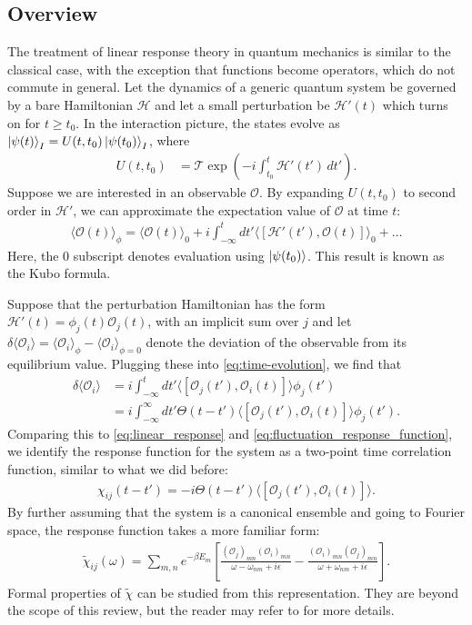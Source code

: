 \documentclass[prl,
twocolumn,
nofootinbib,
amsmath,amssymb,
aps]{revtex4-1}
\newcommand{\be}{\beta}
\newcommand{\f}[2]{\frac{#1}{#2}}
\newcommand{\lp}{\left(}
\newcommand{\rp}{\right)}
\newcommand{\lb}{\left[}
\newcommand{\rb}{\right]}
\begin{document}
\subsection{Overview}
The treatment of linear response theory in quantum mechanics is similar to the classical case, with the exception that functions become operators, which do not commute in general. Let the dynamics of a generic quantum system be governed by a bare Hamiltonian $\mathcal{H}$ and let a small perturbation be $\mathcal{H}'(t)$ which turns on for $t\geq t_0$. In the interaction picture, the states evolve as $\ket{\psi(t)}_I = U(t,t_0) \ket{\psi(t_0)}_I$, where
\begin{align*}
U(t,t_0) 
&= \mathcal{T} \exp\lp -i \int_{t_0}^t  \mathcal{H}'(t')\,dt'\rp.
\end{align*}
Suppose we are interested in an observable $\mathcal{O}$. By expanding $U(t,t_0)$ to second order in $\mathcal{H}'$, we can approximate the expectation value of $\mathcal{O}$ at time $t$:
\begin{align}
\label{eq:time-evolution}
\langle \mathcal{O}(t) \rangle_{\phi} = \langle \mathcal{O}(t) \rangle_{0} + i \int_{-\infty}^t dt' \langle [\mathcal{H'}(t'), \mathcal{O} (t)] \rangle_{0} + \dots
\end{align}
Here, the $0$ subscript denotes evaluation using $\ket{\psi(t_0)}$.  This result is known as the Kubo formula. 

Suppose that the perturbation Hamiltonian has the form $\mathcal{H}'(t) =  \phi_j (t) \mathcal{O}_j(t)$, with an implicit sum over $j$ and let $\delta \langle \mathcal{O}_i \rangle = \langle \mathcal{O}_i \rangle_\phi - \langle  \mathcal{O}_i \rangle_{\phi = 0}$ denote the deviation of the observable from its equilibrium value. Plugging these into \eqref{eq:time-evolution}, we find that
\begin{align*}
\delta \langle \mathcal{O}_i \rangle 
&=  i \int_{-\infty}^t dt' \langle  [ \mathcal{O}_j(t'), \mathcal{O}_i(t)   ] \rangle \phi_j(t') \\
&= i \int_{-\infty}^\infty dt' \Theta(t-t') \langle  [ \mathcal{O}_j(t'), \mathcal{O}_i(t)   ] \rangle \phi_j(t').
\end{align*} 
Comparing this to \eqref{eq:linear_response} and \eqref{eq:fluctuation_response_function}, we identify the response function for the system as a two-point time correlation function, similar to what we did before:
\begin{align}\label{eq:corr_func}
\chi_{ij}(t-t') = -i \Theta(t-t') \langle  [ \mathcal{O}_j(t'), \mathcal{O}_i(t)   ] \rangle.
\end{align}
By further assuming that the system is a canonical ensemble and going to Fourier space, the response function takes a more familiar form:
\begin{align*}
\widetilde{\chi}_{ij}(\omega) = \sum_{m,n} e^{-\be E_m} \lb 
\f{(\mathcal{O}_j)_{mn}(\mathcal{O}_i)_{mn}}{\omega - \omega_{nm} + i\epsilon} 
- 
\f{(\mathcal{O}_i)_{mn}(\mathcal{O}_j)_{mn}}{\omega + \omega_{nm} + i\epsilon} 
\rb.
\end{align*}
Formal properties of $\widetilde{\chi}$ can be studied from this representation. They are beyond the scope of this review, but the reader may refer to \cite{pitaevskii2016bose} for more details.  
\end{document}
